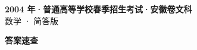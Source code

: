 \documentclass[zihao=-4, a4paper]{ctexart}
\begin{document}
\begin{center}
  {\Large\bfseries 2004 年·普通高等学校春季招生考试·安徽卷文科}\\[4pt]
  {\large 数学 · 简答版}
\end{center}
\medskip
{}

\clearpage
{}
\begin{center}{\Large\bfseries 答案速查}\end{center}
\medskip

\end{document}
